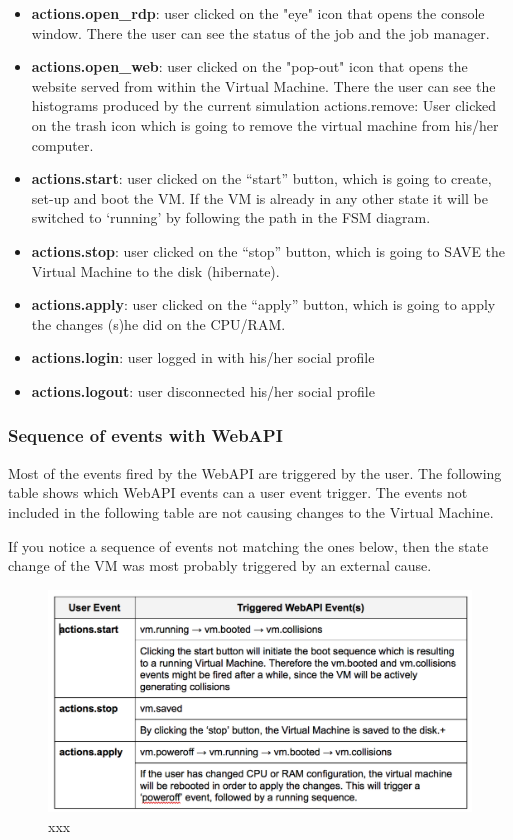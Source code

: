 \documentclass{article}
\begin{document}
\begin{itemize}
    \item {\bf actions.open\_rdp}: user clicked on the "eye" icon that opens the console window. There the user can see the status of the job and the job manager.
    
    \item {\bf actions.open\_web}: user clicked on the "pop-out" icon that opens the website served from within the Virtual Machine. There the user can see the histograms produced by the current simulation
actions.remove: User clicked on the trash icon which is going to remove the virtual machine from his/her computer.
    \item {\bf actions.start}: user clicked on the “start” button, which is going to create, set-up and boot the VM. If the VM is already in any other state it will be switched to ‘running’ by following the path in the FSM diagram.
    \item {\bf actions.stop}: user clicked on the “stop” button, which is going to SAVE the Virtual Machine to the disk (hibernate). 
    \item {\bf actions.apply}: user clicked on the “apply” button, which is going to apply the changes (s)he did on the CPU/RAM.
    \item {\bf actions.login}: user logged in with his/her social profile
    \item {\bf actions.logout}: user disconnected his/her social profile
\end{itemize}


\subsubsection{Sequence of events with WebAPI}

Most of the events fired by the WebAPI are triggered by the user. The following table shows which WebAPI events can a user event trigger. The events not included in the following table are not causing changes to the Virtual Machine.

If you notice a sequence of events not matching the ones below, then the state change of the VM was most probably triggered by an external cause. 


\begin{figure}[t]
  \begin{center}
		\includegraphics[width=\columnwidth]{imgs/webAPIEventsSequenceTable.png}
  \end{center}
\caption{xxx}
\label{xxx}
\end{figure}
\end{document}
